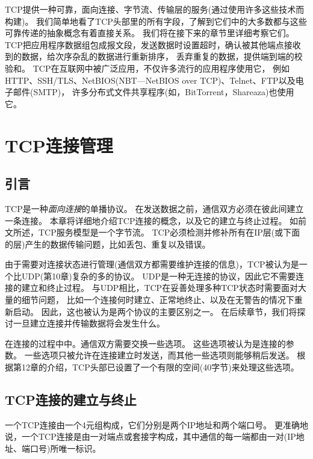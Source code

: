 \documentclass{../main.tex}{subfiles}
\begin{document}
TCP提供一种可靠，面向连接、字节流、传输层的服务(通过使用许多这些技术而构建)。
我们简单地看了TCP头部里的所有字段，了解到它们中的大多数都与这些可靠传递的抽象概念有着直接关系。
我们将在接下来的章节里详细考察它们。
TCP把应用程序数据组包成报文段，发送数据时设置超时，确认被其他端点接收到的数据，给次序杂乱的数据进行重新排序，
    丢弃重复的数据，提供端到端的校验和。
TCP在互联网中被广泛应用，不仅许多流行的应用程序使用它，
    例如HTTP、SSH/TLS、NetBIOS(NBT---NetBIOS over TCP)、Telnet、FTP以及电子邮件(SMTP)，
    许多分布式文件共享程序(如，BitTorrent，Shareaza)也使用它。


\chapter{TCP连接管理}
\section{引言}
TCP是一种\emph{面向连接}的单播协议。
在发送数据之前，通信双方必须在彼此间建立一条连接。
本章将详细地介绍TCP连接的概念，以及它的建立与终止过程。
如前文所述，TCP服务模型是一个字节流。
TCP必须检测并修补所有在IP层(或下面的层)产生的数据传输问题，比如丢包、重复以及错误。

由于需要对连接状态进行管理(通信双方都需要维护连接的信息)，TCP被认为是一个比UDP(第10章)复杂的多的协议。
UDP是一种无连接的协议，因此它不需要连接的建立和终止过程。
与UDP相比，TCP在妥善处理多种TCP状态时需要面对大量的细节问题，
    比如一个连接何时建立、正常地终止、以及在无警告的情况下重新启动。
因此，这也被认为是两个协议的主要区别之一。
在后续章节，我们将探讨一旦建立连接并传输数据将会发生什么。

在连接的过程中中。通信双方需要交换一些选项。
这些选项被认为是连接的参数。
一些选项只被允许在连接建立时发送，而其他一些选项则能够稍后发送。
根据第12章的介绍，TCP头部已设置了一个有限的空间(40字节)来处理这些选项。


\section{TCP连接的建立与终止}
一个TCP连接由一个4元组构成，它们分别是两个IP地址和两个端口号。
更准确地说，一个TCP连接是由一对端点或套接字构成，其中通信的每一端都由一对(IP地址、端口号)所唯一标识。
\end{document}
